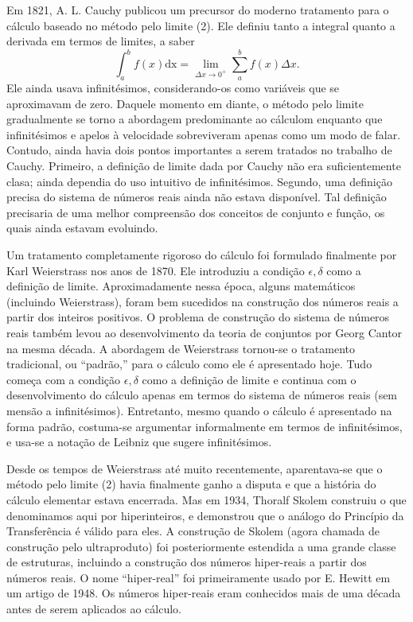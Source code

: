 \documentclass{svmono}
\begin{document}
Em 1821, A. L. Cauchy publicou um precursor do moderno tratamento para
o cálculo baseado no método pelo limite (2). Ele definiu tanto a integral
quanto a derivada em termos de limites, a saber
\[
\int_a^b f(x) \mathrm{dx} = \lim_{\Delta x \rightarrow 0^+} \sum_{a}^{b} f(x) \Delta x.
\]
Ele ainda usava infinitésimos, considerando-os como variáveis que
se aproximavam de zero. Daquele momento em diante, o método pelo
limite gradualmente se torno a abordagem predominante ao cálculom
enquanto que infinitésimos e apelos à velocidade sobreviveram apenas
como um modo de falar. Contudo, ainda havia dois pontos importantes a serem
tratados no trabalho de Cauchy. Primeiro, a definição de limite dada por
Cauchy não era suficientemente clasa; ainda dependia do uso intuitivo
de infinitésimos. Segundo, uma definição precisa do sistema de números
reais ainda não estava disponível. Tal definição precisaria de uma
melhor compreensão dos conceitos de conjunto e função, os quais ainda
estavam evoluindo.

Um tratamento completamente rigoroso do cálculo foi formulado finalmente
por Karl Weierstrass nos anos de 1870. Ele introduziu a condição
$\epsilon,\delta$ como a definição de limite. Aproximadamente nessa
época, alguns matemáticos (incluindo Weierstrass), foram bem sucedidos
na construção dos números reais a partir dos inteiros positivos. O
problema de construção do sistema de números reais também levou ao
desenvolvimento da teoria de conjuntos por Georg Cantor na mesma
década. A abordagem de Weierstrass tornou-se o tratamento tradicional,
ou ``padrão,'' para o cálculo como ele é apresentado hoje. Tudo começa
com a condição $\epsilon,\delta$ como a definição de limite e continua
com o desenvolvimento do cálculo apenas em termos do sistema de
números reais (sem mensão a infinitésimos). Entretanto, mesmo quando
o cálculo é apresentado na forma padrão, costuma-se argumentar
informalmente em termos de infinitésimos, e usa-se a notação de
Leibniz que sugere infinitésimos.

Desde os tempos de Weierstrass até muito recentemente, aparentava-se
que o método pelo limite (2) havia finalmente ganho a disputa e
que a história do cálculo elementar estava encerrada. Mas em 1934,
Thoralf Skolem construiu o que denominamos aqui por hiperinteiros,
e demonstrou que o análogo do Princípio da Transferência é válido para
eles. A construção de Skolem (agora chamada de construção pelo
ultraproduto) foi posteriormente estendida a uma grande classe de
estruturas, incluindo a construção dos números hiper-reais a partir
dos números reais. O nome ``hiper-real'' foi primeiramente usado por
E. Hewitt em um artigo de 1948. Os números hiper-reais eram conhecidos
mais de uma década antes de serem aplicados ao cálculo.
\end{document}
